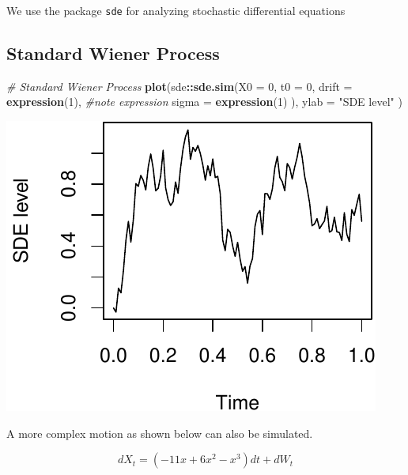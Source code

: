 \documentclass[11pt,]{article}
\newenvironment{Shaded}{\begin{snugshade}}{\end{snugshade}}
\newcommand{\KeywordTok}[1]{\textcolor[rgb]{0.13,0.29,0.53}{\textbf{#1}}}
\newcommand{\DataTypeTok}[1]{\textcolor[rgb]{0.13,0.29,0.53}{#1}}
\newcommand{\DecValTok}[1]{\textcolor[rgb]{0.00,0.00,0.81}{#1}}
\newcommand{\StringTok}[1]{\textcolor[rgb]{0.31,0.60,0.02}{#1}}
\newcommand{\CommentTok}[1]{\textcolor[rgb]{0.56,0.35,0.01}{\textit{#1}}}
\newcommand{\OperatorTok}[1]{\textcolor[rgb]{0.81,0.36,0.00}{\textbf{#1}}}
\newcommand{\NormalTok}[1]{#1}
\begin{document}
We use the package \texttt{sde} for analyzing stochastic differential
equations

\subsection{Standard Wiener Process}\label{standard-wiener-process}

\begin{Shaded}
\begin{Highlighting}[]
\CommentTok{# Standard Wiener Process}
\KeywordTok{plot}\NormalTok{(sde}\OperatorTok{::}\KeywordTok{sde.sim}\NormalTok{(}\DataTypeTok{X0 =} \DecValTok{0}\NormalTok{, }\DataTypeTok{t0 =} \DecValTok{0}\NormalTok{, }
                  \DataTypeTok{drift =} \KeywordTok{expression}\NormalTok{(}\DecValTok{1}\NormalTok{), }\CommentTok{#note expression}
                  \DataTypeTok{sigma =} \KeywordTok{expression}\NormalTok{(}\DecValTok{1}\NormalTok{)}
\NormalTok{                  ),}
     \DataTypeTok{ylab =} \StringTok{"SDE level"}
\NormalTok{     )}
\end{Highlighting}
\end{Shaded}

\begin{center}\includegraphics{FMC_T4_PhD_Wiener_Process_files/figure-latex/sde_Wiener-1} \end{center}

A more complex motion as shown below can also be simulated.

\[dX_t = (-11x + 6x^2 -x^3)dt + dW_t\]
\end{document}

